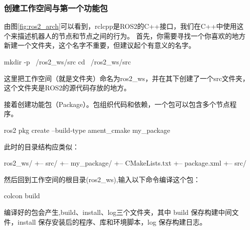 \subsubsection{创建工作空间与第一个功能包}
由图\ref{fig:ros2_arch}可以看到，rclcpp是ROS2的C++接口，我们在C++中使用这个来描述机器人的节点和节点之间的行为。
首先，你需要寻找一个你喜欢的地方新建一个文件夹，这个名字不重要，但建议起个有意义的名字。
\par\medskip\noindent\begin{minipage}{\linewidth}
\begin{tbash}
    mkdir -p ~/ros2_ws/src
    cd ~/ros2_ws/src
\end{tbash}
\end{minipage}\par\smallskip

这里把工作空间（就是文件夹）命名为ros2\_ws，并在其下创建了一个src文件夹，这个文件夹是ROS2的源代码存放的地方。

接着创建功能包（Package）。包组织代码和依赖，一个包可以包含多个节点程序。
\par\medskip\noindent\begin{minipage}{\linewidth}
\begin{tbash}
    ros2 pkg create --build-type ament_cmake my_package
\end{tbash}
\end{minipage}\par\smallskip
{}
此时的目录结构应类似：
\par\medskip\noindent\begin{minipage}{\linewidth}
\begin{tbash}
ros2_ws/
+-- src/
    +-- my_package/
        +-- CMakeLists.txt
        +-- package.xml
        +-- src/
\end{tbash}
\end{minipage}\par\smallskip

然后回到工作空间的根目录(ros2\_ws),输入以下命令编译这个包：

\par\medskip\noindent\begin{minipage}{\linewidth}
\begin{tbash}
    colcon build
\end{tbash}
\end{minipage}\par\smallskip

编译好的包会产生,build、install、log三个文件夹，其中 build 保存构建中间文件，install 保存安装后的程序、库和环境脚本，log 保存构建日志。

